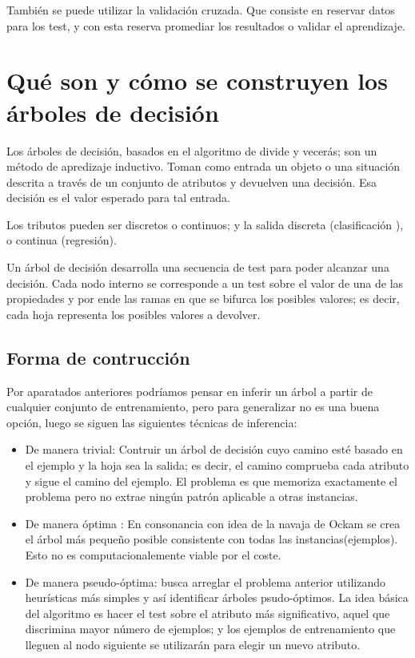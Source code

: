 \documentclass[12 pt, a4paper]{article}
\begin{document}
También se puede utilizar la validación cruzada. Que consiste en reservar datos para los test, y con esta reserva promediar los resultados o validar el aprendizaje. 


\newpage 


\section{Qué son y cómo se construyen los árboles de decisión}

Los árboles de decisión, basados en el algoritmo de divide y vecerás; son un método de apredizaje inductivo. 
Toman como entrada un objeto o una situación descrita a través de un conjunto de atributos y devuelven una decisión.
Esa decisión es el valor esperado para tal entrada.

Los tributos pueden ser discretos o continuos; y la salida discreta (clasificación ), o continua (regresión).

Un árbol de decisión desarrolla una secuencia de test para poder alcanzar una decisión. Cada nodo interno 
se corresponde a un test sobre el valor de una de las propiedades y por ende las ramas en que se bifurca los posibles valores; 
es decir, cada hoja representa los posibles valores a devolver. 

\subsection*{Forma de contrucción}  

Por aparatados anteriores podríamos pensar en inferir un árbol a partir de cualquier conjunto de entrenamiento, 
pero para generalizar no es una buena opción, luego se siguen las siguientes técnicas de inferencia: 

\begin{itemize}
  \item De manera trivial: Contruir un árbol de decisión cuyo camino esté basado en el ejemplo y la hoja sea la salida; es decir, 
  el camino comprueba cada atributo y sigue el camino del ejemplo. El problema es que memoriza exactamente el problema pero no extrae ningún patrón
  aplicable a otras instancias. 
  \item De manera óptima : En consonancia con idea de la navaja de Ockam se crea el árbol más pequeño posible consistente con todas las instancias(ejemplos). Esto no es computacionalemente viable por el coste. 
  \item De manera pseudo-óptima: busca arreglar el problema anterior utilizando heurísticas más simples y así identificar árboles psudo-óptimos. 
  La idea básica del algoritmo es hacer el test sobre el atributo más significativo, aquel que discrimina mayor número de ejemplos; y los ejemplos de entrenamiento que lleguen al nodo siguiente se utilizarán para elegir un nuevo atributo. 
\end{itemize}
\end{document}
